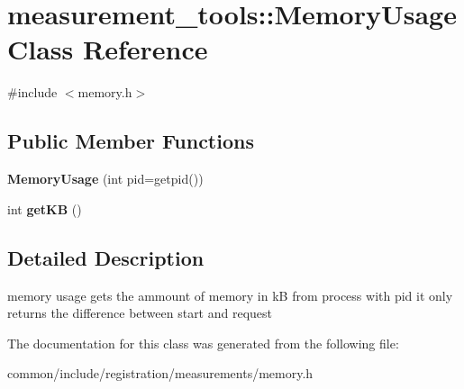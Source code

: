 \hypertarget{classmeasurement__tools_1_1MemoryUsage}{
\section{measurement\_\-tools::MemoryUsage Class Reference}
\label{classmeasurement__tools_1_1MemoryUsage}
}


{\ttfamily \#include $<$memory.h$>$}

\subsection*{Public Member Functions}
\begin{DoxyCompactItemize}
\item 
\hypertarget{classmeasurement__tools_1_1MemoryUsage_ada439c8ba07a0c1b557ad032a977f97a}{
{\bfseries MemoryUsage} (int pid=getpid())}
\label{classmeasurement__tools_1_1MemoryUsage_ada439c8ba07a0c1b557ad032a977f97a}

\item 
\hypertarget{classmeasurement__tools_1_1MemoryUsage_a574c658df378529dd33fd8a74b1ed493}{
int {\bfseries getKB} ()}
\label{classmeasurement__tools_1_1MemoryUsage_a574c658df378529dd33fd8a74b1ed493}

\end{DoxyCompactItemize}


\subsection{Detailed Description}
memory usage gets the ammount of memory in kB from process with pid it only returns the difference between start and request 

The documentation for this class was generated from the following file:\begin{DoxyCompactItemize}
\item 
common/include/registration/measurements/memory.h\end{DoxyCompactItemize}
